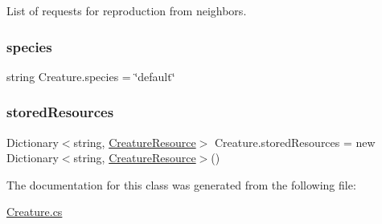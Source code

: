 List of requests for reproduction from neighbors. 

\mbox{\label{class_creature_a721fb38fcd0d2e7bfc307a6921e3fa2e}} 
\subsubsection{\texorpdfstring{species}{species}}
{\footnotesize\ttfamily string Creature.\+species = \char`\"{}default\char`\"{}}

\mbox{\label{class_creature_a1c4a7443dd2c8748ce3322b68914788a}} 
\subsubsection{\texorpdfstring{stored\+Resources}{storedResources}}
{\footnotesize\ttfamily Dictionary$<$string, \mbox{\hyperlink{class_creature_resource}{Creature\+Resource}}$>$ Creature.\+stored\+Resources = new Dictionary$<$string, \mbox{\hyperlink{class_creature_resource}{Creature\+Resource}}$>$()}



The documentation for this class was generated from the following file\+:\begin{DoxyCompactItemize}
\item 
\mbox{\hyperlink{_creature_8cs}{Creature.\+cs}}\end{DoxyCompactItemize}
